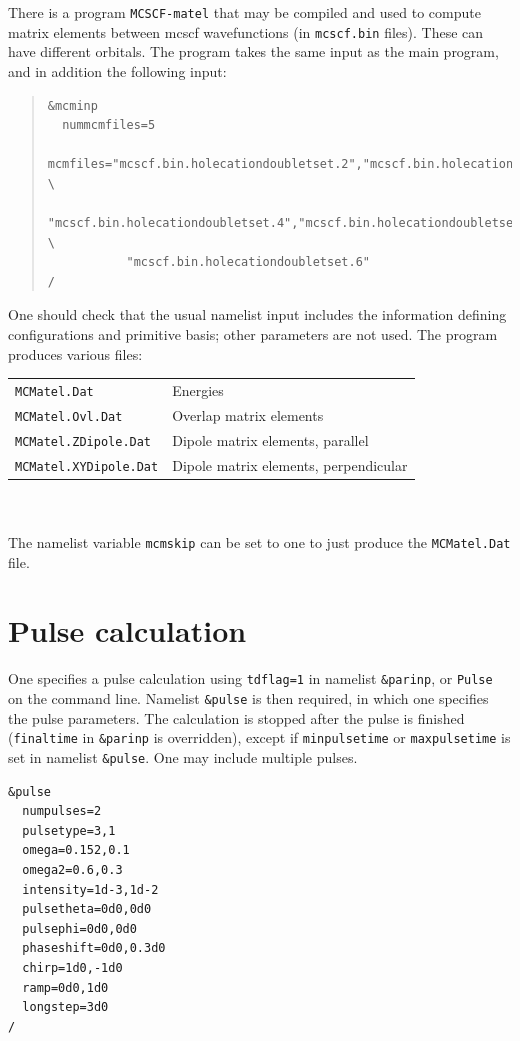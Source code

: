 \documentclass[10pt,leqno, oneside]{book}
\begin{document}
There is a program \verb#MCSCF-matel# that may be compiled and used to compute matrix elements between mcscf wavefunctions (in \verb#mcscf.bin#
files).  These can have different orbitals.  The program takes the same input as the main program, and in addition the following input:
%
\begin{quote}{\footnotesize
\begin{verbatim}
&mcminp
  nummcmfiles=5
  mcmfiles="mcscf.bin.holecationdoubletset.2","mcscf.bin.holecationdoubletset.3", \
           "mcscf.bin.holecationdoubletset.4","mcscf.bin.holecationdoubletset.5", \
           "mcscf.bin.holecationdoubletset.6"
/
\end{verbatim}}
\end{quote}
One should check that the usual namelist input includes the information defining configurations and primitive basis; other parameters are not used.
The program produces various files:  \\

\begin{tabular}{ll}
\verb#MCMatel.Dat# & Energies \\
\verb#MCMatel.Ovl.Dat# & Overlap matrix elements \\
\verb#MCMatel.ZDipole.Dat# & Dipole matrix elements, parallel \\
\verb#MCMatel.XYDipole.Dat# & Dipole matrix elements, perpendicular \\
\end{tabular} \\ \\
%
The namelist variable \verb#mcmskip# can be set to one to just produce the \verb#MCMatel.Dat# file.


\section{Pulse calculation}

One specifies a pulse calculation using \verb#tdflag=1# in namelist \verb#&parinp#, or \verb#Pulse# on the 
command line.  Namelist \verb#&pulse# is then required, in which one specifies the pulse parameters.  
The calculation is stopped after the pulse is finished (\verb#finaltime# in \verb#&parinp# is overridden), except if 
\verb#minpulsetime# or \verb#maxpulsetime# is set in namelist \verb#&pulse#.
  One may include
multiple pulses.  

{\footnotesize
\begin{verbatim}
&pulse
  numpulses=2
  pulsetype=3,1
  omega=0.152,0.1
  omega2=0.6,0.3
  intensity=1d-3,1d-2
  pulsetheta=0d0,0d0
  pulsephi=0d0,0d0
  phaseshift=0d0,0.3d0
  chirp=1d0,-1d0
  ramp=0d0,1d0
  longstep=3d0
/
\end{verbatim}}
\end{document}
